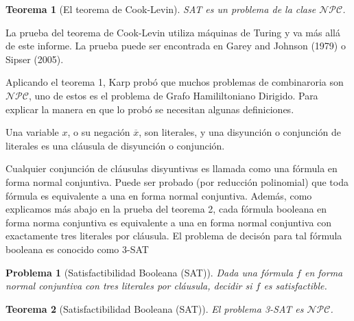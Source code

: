 \documentclass{article}
\newtheorem{theorem}{Teorema}
\newtheorem{problem}{Problema}
\begin{document}
\begin{theorem}[El teorema de Cook-Levin]
SAT es un problema de la clase $\mathcal{NPC}$.
\end{theorem}
La prueba del teorema de Cook-Levin utiliza máquinas de Turing
y va más allá de este informe. La prueba puede ser encontrada
en Garey and Johnson (1979) o Sipser (2005).

Aplicando el teorema 1, Karp probó que muchos problemas de
combinaroria son $\mathcal{NPC}$, uno de estos es el problema
de Grafo Hamililtoniano Dirigido. Para explicar la manera
en que lo probó se necesitan algunas definiciones.

Una variable $x$, o su negación $\overline{x}$, son literales,
y una disyunción o conjunción de literales es una cláusula
de disyunción o conjunción.

Cualquier conjunción de cláusulas disyuntivas es llamada como
una fórmula en forma normal conjuntiva. Puede ser probado 
(por reducción polinomial) que toda fórmula es equivalente
a una en forma normal conjuntiva. Además, como explicamos más
abajo en la prueba del teorema 2, cada fórmula booleana en 
forma norma conjuntiva es equivalente a una en forma normal
conjuntiva con exactamente tres literales por cláusula. El
problema de decisón para tal fórmula booleana es conocido como
3-SAT

\begin{problem}[Satisfactibilidad Booleana (SAT)]
Dada una fórmula $f$ en forma normal conjuntiva con tres
literales por cláusula, decidir si $f$ es satisfactible.
\end{problem}

\begin{theorem}[Satisfactibilidad Booleana (SAT)]
El problema 3-SAT es $\mathcal{NPC}$.
\end{theorem}
\end{document}
